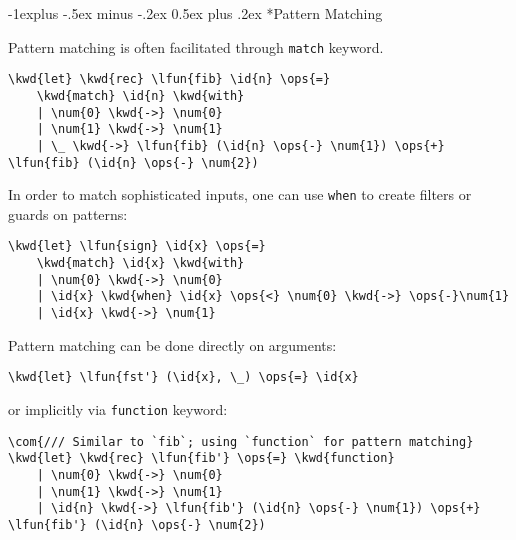 \documentclass[10pt,landscape]{article}
\makeatletter
\renewcommand{\subsection}{\@startsection{subsection}{2}{0mm}%
                                {-1explus -.5ex minus -.2ex}%
                                {0.5ex plus .2ex}%
                                {\normalfont\normalsize\bfseries}}
\newcommand{\id}[1]{\textcolor[HTML]{000000}{#1}}
\newcommand{\kwd}[1]{\textcolor[HTML]{0000FF}{#1}}
\newcommand{\com}[1]{\textcolor[HTML]{008000}{#1}}
\newcommand{\ops}[1]{\textcolor[HTML]{000000}{#1}}
\newcommand{\num}[1]{\textcolor[HTML]{000000}{#1}}
\newcommand{\lfun}[1]{\textcolor[HTML]{AA5500}{#1}}
\makeatother
\begin{document}
\begin{multicols}{3}
\begin{Verbatim}[commandchars=\\\{\}]
\end{Verbatim}

\subsection*{Pattern Matching}



Pattern matching is often facilitated through \texttt{match} keyword.
\begin{Verbatim}[commandchars=\\\{\}]
\kwd{let} \kwd{rec} \lfun{fib} \id{n} \ops{=}
    \kwd{match} \id{n} \kwd{with}
    | \num{0} \kwd{->} \num{0}
    | \num{1} \kwd{->} \num{1}
    | \_ \kwd{->} \lfun{fib} (\id{n} \ops{-} \num{1}) \ops{+} \lfun{fib} (\id{n} \ops{-} \num{2})

\end{Verbatim}



In order to match sophisticated inputs, one can use \texttt{when} to create filters or guards on patterns:
\begin{Verbatim}[commandchars=\\\{\}]
\kwd{let} \lfun{sign} \id{x} \ops{=} 
    \kwd{match} \id{x} \kwd{with}
    | \num{0} \kwd{->} \num{0}
    | \id{x} \kwd{when} \id{x} \ops{<} \num{0} \kwd{->} \ops{-}\num{1}
    | \id{x} \kwd{->} \num{1}

\end{Verbatim}



Pattern matching can be done directly on arguments:
\begin{Verbatim}[commandchars=\\\{\}]
\kwd{let} \lfun{fst'} (\id{x}, \_) \ops{=} \id{x}

\end{Verbatim}



or implicitly via \texttt{function} keyword:
\begin{Verbatim}[commandchars=\\\{\}]
\com{/// Similar to `fib`; using `function` for pattern matching}
\kwd{let} \kwd{rec} \lfun{fib'} \ops{=} \kwd{function}
    | \num{0} \kwd{->} \num{0}
    | \num{1} \kwd{->} \num{1}
    | \id{n} \kwd{->} \lfun{fib'} (\id{n} \ops{-} \num{1}) \ops{+} \lfun{fib'} (\id{n} \ops{-} \num{2})

\end{Verbatim}




\end{multicols}
\end{document}
